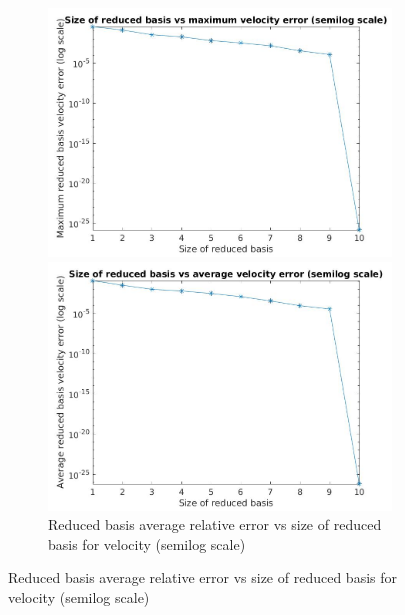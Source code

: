 \documentclass[a4paper,oneside,openright,spanish,english]{book}
\begin{document}
\begin{figure}
\begin{subfigure}{\textwidth}
  \includegraphics[width=\linewidth,height=0.45\textheight]{same_train_test/size_vs_maximum_reduced_basis_velocity_error_semilog.jpg}
  \caption{Reduced basis maximum relative error vs size of reduced basis for velocity (semilog scale)}
  \label{rb_max_velocity_error_vs_size} 
    \includegraphics[width=\linewidth,height=0.45\textheight]{same_train_test/size_vs_average_reduced_basis_velocity_error_semilog.jpg}
  \caption{Reduced basis average relative error vs size of reduced basis for velocity (semilog scale)}
  \label{rb_avg_velocity_error_vs_size} 
  \end{subfigure}
 \end{figure}
\end{document}
